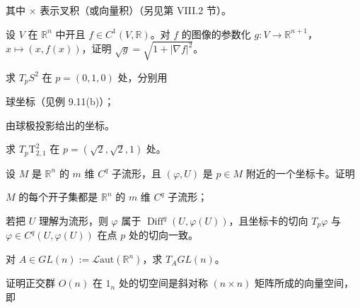 \begin{exercises}
\begin{items}
其中 $ \times $ 表示叉积（或向量积）（另见第 VIII.2 节）。

\item

设 $ V $ 在 $ \mathbb{R}^{n} $ 中开且 $ f \in C^{1}(V,\mathbb{R}) $。对 $ f $ 的图像的参数化 $ g : V \to \mathbb{R}^{n+1} $，$ x \mapsto (x,f(x)) $，证明 $ \sqrt{g} = \sqrt{1 + |\nabla f|^{2}} $。

\end{items}

\item

求 $ T_{p}S^{2} $ 在 $ p = (0,1,0) $ 处，分别用

\begin{items}
\item

球坐标（见例 9.11(b)）；

\item

由球极投影给出的坐标。

\end{items}

\item

求 $ T_{p}\mathrm{T}_{2,1}^{2} $ 在 $ p = (\sqrt{2},\sqrt{2},1) $ 处。

\item

设 $ M $ 是 $ \mathbb{R}^{n} $ 的 $ m $ 维 $ C^{q} $ 子流形，且 $ (\varphi,U) $ 是 $ p \in M $ 附近的一个坐标卡。证明

\begin{items}
\item

$ M $ 的每个开子集都是 $ \mathbb{R}^{n} $ 的 $ m $ 维 $ C^{q} $ 子流形；

\item

若把 $ U $ 理解为流形，则 $ \varphi $ 属于 $ \operatorname{Diff}^{q}(U,\varphi(U)) $，且坐标卡的切向 $ T_{p}\varphi $ 与 $ \varphi \in C^{q}(U,\varphi(U)) $ 在点 $ p $ 处的切向一致。

\end{items}

\item

对 $ A \in GL(n) := \mathcal{L}\mathrm{aut}(\mathbb{R}^{n}) $，求 $ T_{A}GL(n) $。

\item

证明正交群 $ O(n) $ 在 $ 1_{n} $ 处的切空间是斜对称 $ (n \times n) $ 矩阵所成的向量空间，即


\end{exercises}
